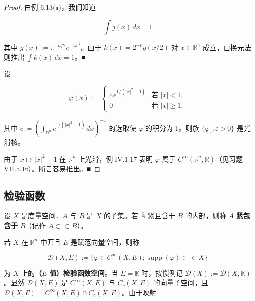 \begin{proof}

由例 6.13(a)，我们知道

\[
\int g(x)\,dx = 1
\]

其中 $ g(x) := \pi^{-n/2}e^{-|x|^{2}} $。由于 $ k(x) = 2^{-n}g(x/2) $ 对 $ x \in \mathbb{R}^{n} $ 成立，由换元法则推出 $ \int k(x)\,dx = 1 $。\nobreak\hspace{0.35em}■

\begin{items}
\item[（b）]

设

\begin{equation*}
\varphi(x) := \begin{cases} c\,e^{1/(|x|^{2}-1)} & \text{若 } |x| < 1 , \\ 0 & \text{若 } |x| \ge 1 , \end{cases}
\end{equation*}

其中 $ c := \left(\int_{\mathbb{B}^{n}}e^{1/(|x|^{2}-1)}\,dx\right)^{-1} $ 的选取使 $ \varphi $ 的积分为 1。则族 $ \{\varphi_{\varepsilon} ; \varepsilon > 0\} $ 是光滑核。

\end{items}


\proofhead
由于 $ x \mapsto |x|^{2} - 1 $ 在 $ \mathbb{R}^{n} $ 上光滑，例 IV.1.17 表明 $ \varphi $ 属于 $ C^{\infty}(\mathbb{R}^{n},\mathbb{R}) $（见习题 VII.5.16）。断言容易推出。\nobreak\hspace{0.35em}■
\end{proof}

\subsection*{检验函数}

设 $ X $ 是度量空间，$ A $ 与 $ B $ 是 $ X $ 的子集。若 $ \overline{A} $ 紧且含于 $ B $ 的内部，则称 $ A $ \textbf{紧包含于} $ B $（记作 $ A \subset\subset B $）。

若 $ X $ 在 $ \mathbb{R}^{n} $ 中开且 $ E $ 是赋范向量空间，则称

\[
\mathcal{D}(X,E) := \{\varphi \in C^{\infty}(X,E) ; \operatorname{supp}(\varphi) \subset\subset X\}
\]

为 $ X $ 上的\textbf{（$ E $ 值）检验函数空间}。当 $ E = \mathbb{K} $ 时，按惯例记 $ \mathcal{D}(X) := \mathcal{D}(X,\mathbb{K}) $。显然 $ \mathcal{D}(X,E) $ 是 $ C^{\infty}(X,E) $ 与 $ C_{c}(X,E) $ 的向量子空间，且 $ \mathcal{D}(X,E) = C^{\infty}(X,E) \cap C_{c}(X,E) $。由于映射

